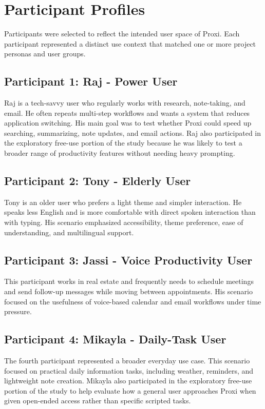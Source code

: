 \documentclass[12pt, titlepage]{article}
\begin{document}
\section{Participant Profiles}

Participants were selected to reflect the intended user space of Proxi.
Each participant represented a distinct use context that matched one or
more project personas and user groups.

\subsection{Participant 1: Raj - Power User}

Raj is a tech-savvy user who regularly works with research, note-taking,
and email. He often repeats multi-step workflows and wants a system that
reduces application switching. His main goal was to test whether Proxi
could speed up searching, summarizing, note updates, and email actions.
Raj also participated in the exploratory free-use portion of the study
because he was likely to test a broader range of productivity features
without needing heavy prompting.

\subsection{Participant 2: Tony - Elderly User}

Tony is an older user who prefers a light theme and simpler interaction.
He speaks less English and is more comfortable with direct spoken
interaction than with typing. His scenario emphasized accessibility,
theme preference, ease of understanding, and multilingual support.

\subsection{Participant 3: Jassi - Voice Productivity User}

This participant works in real estate and frequently needs to schedule
meetings and send follow-up messages while moving between appointments.
His scenario focused on the usefulness of voice-based calendar and email
workflows under time pressure.

\subsection{Participant 4: Mikayla - Daily-Task User}

The fourth participant represented a broader everyday use case. This
scenario focused on practical daily information tasks, including
weather, reminders, and lightweight note creation. Mikayla also
participated in the exploratory free-use portion of the study to help
evaluate how a general user approaches Proxi when given open-ended
access rather than specific scripted tasks.
\end{document}
